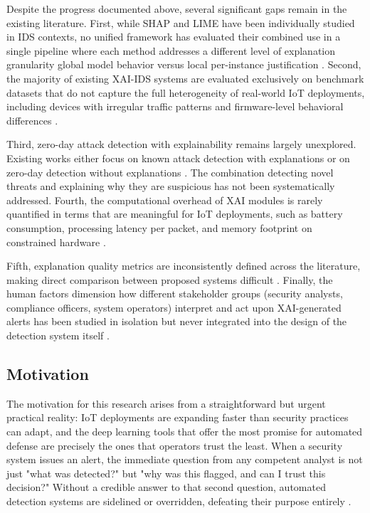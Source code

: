 \documentclass[a4paper,fleqn]{cas-dc}
\numberwithin{equation}{section}
\begin{document}
Despite the progress documented above, several significant gaps remain in the existing literature. First, while SHAP and LIME have been individually studied in IDS contexts, no unified framework has evaluated their combined use in a single pipeline where each method addresses a different level of explanation granularity global model behavior versus local per-instance justification \cite{ieee2024limeshap, nguyen2022explainable}. Second, the majority of existing XAI-IDS systems are evaluated exclusively on benchmark datasets that do not capture the full heterogeneity of real-world IoT deployments, including devices with irregular traffic patterns and firmware-level behavioral differences \cite{islam2023robust, jes2024iot}.

Third, zero-day attack detection with explainability remains largely unexplored. Existing works either focus on known attack detection with explanations \cite{siganos2023explainable, saheed2022explainable} or on zero-day detection without explanations \cite{aspg2025zeroday}. The combination detecting novel threats and explaining why they are suspicious has not been systematically addressed. Fourth, the computational overhead of XAI modules is rarely quantified in terms that are meaningful for IoT deployments, such as battery consumption, processing latency per packet, and memory footprint on constrained hardware \cite{ijcrt2025threat, chen2022explainable}.

Fifth, explanation quality metrics are inconsistently defined across the literature, making direct comparison between proposed systems difficult \cite{frontiers2025ids, das2023trustworthy}. Finally, the human factors dimension how different stakeholder groups (security analysts, compliance officers, system operators) interpret and act upon XAI-generated alerts has been studied in isolation \cite{zolanvari2021transparent} but never integrated into the design of the detection system itself \cite{mdpi2025industry5, anthony2025designing}.

\subsection{Motivation}

The motivation for this research arises from a straightforward but urgent practical reality: IoT deployments are expanding faster than security practices can adapt, and the deep learning tools that offer the most promise for automated defense are precisely the ones that operators trust the least. When a security system issues an alert, the immediate question from any competent analyst is not just "what was detected?" but "why was this flagged, and can I trust this decision?" Without a credible answer to that second question, automated detection systems are sidelined or overridden, defeating their purpose entirely \cite{das2023trustworthy, frontiers2025ids}.
\end{document}
